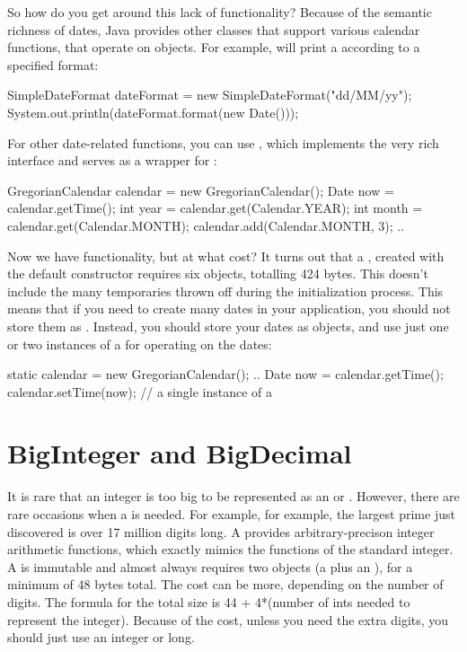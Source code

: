 So how do you get around this lack of functionality?
Because of the semantic richness of dates, Java provides other classes that
support various calendar functions, that operate on  objects. For
example,  will print a  according to a
specified format:
\begin{shortlisting}
    SimpleDateFormat dateFormat =  new SimpleDateFormat("dd/MM/yy"); 
    System.out.println(dateFormat.format(new Date())); 
\end{shortlisting}

For other date-related functions, you can use 
, which implements the very rich 
interface and serves as a wrapper for :
\begin{shortlisting}

	GregorianCalendar calendar = new GregorianCalendar();
    Date now = calendar.getTime();
    int year       = calendar.get(Calendar.YEAR);
	int month      = calendar.get(Calendar.MONTH); 
	calendar.add(Calendar.MONTH, 3); 
	..
    
\end{shortlisting}

Now we have functionality, but at what cost? It turns out that a
, created with the default constructor requires six
objects, totalling 424 bytes. This doesn't include the many temporaries
thrown off during the initialization process. This means that if you need to
create many dates in your application, you should not store them as
. Instead, you should store your dates as 
objects, and use just one or two instances of a  for
operating on the dates:

\begin{shortlisting}
     static calendar = new GregorianCalendar();
     ..
	 Date now = calendar.getTime();
	 calendar.setTime(now);   // a single instance of a 
\end{shortlisting}

\section{BigInteger and BigDecimal}

It is rare that an integer is too big to be represented as an  or
. However, there are rare occasions when a   is
needed. For example, for example, the largest prime
just discovered is over 17 million digits long.
A  provides 
arbitrary-precison integer arithmetic functions, which exactly mimics the
functions of the standard integer. 
A  is immutable and almost always requires two objects (a
 plus an ), for a minimum of 48 bytes total.  The
cost can be more, depending on the number of digits.  The formula for the total size is 
44 + 4*(number of ints needed to represent the integer). 
Because of the cost, unless you need the extra digits, you should just use an integer or long.

